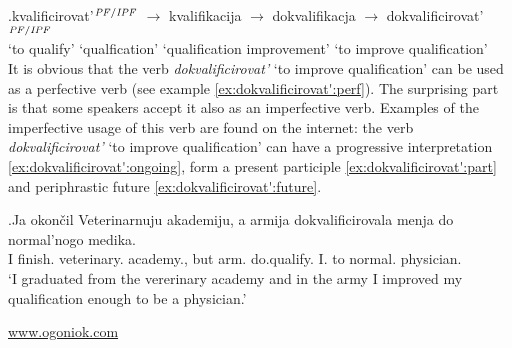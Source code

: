 \exg.\label{chain:dokvalificirovat'}kvalificirovat'$^{{\mathit{PF}}/{\mathit{IPF}}}$ {$\rightarrow$} kvalifikacija {$\rightarrow$} dokvalifikacja {$\rightarrow$} dokvalificirovat'$^{{\mathit{PF}}/{\mathit{IPF}}}$\\
{`to qualify'} {} {`qualfication'} {} {`qualification improvement'} {} {`to improve qualification'}\\

It is obvious that the verb \textit{dokvalificirovat'} `to improve qualification' can be used as a perfective verb (see example \ref{ex:dokvalificirovat':perf}). The surprising part is that some speakers accept it also as an imperfective verb. Examples of the imperfective usage of this verb are found on the internet: the verb \textit{dokvalificirovat'} `to improve qualification' can have a progressive interpretation \ref{ex:dokvalificirovat':ongoing}, form a present participle \ref{ex:dokvalificirovat':part} and periphrastic future \ref{ex:dokvalificirovat':future}. 

\exg.\label{ex:dokvalificirovat':perf}Ja okon\v{c}il Veterinarnuju akademiju, a armija dokvalificirovala menja do normal'nogo medika.\\
I finish. veterinary. academy., but arm. do.qualify. I. to normal. physician.\\
\vspace{0.5em}
`I graduated from the vererinary academy and in the army I improved my qualification enough to be a physician.'
\begin{flushright}
\vspace{-0.5em}
\url{www.ogoniok.com}
\end{flushright}


